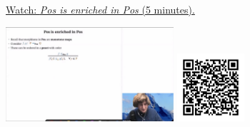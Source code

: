 
\begin{minipage}{10cm}
    \href{https://act4e-spring21.netlify.app/videos/spring2021-enrichment:pos-en-pos.html}{Watch: \emph{Pos is enriched in Pos} (5 minutes).}
        
    \href{https://act4e-spring21.netlify.app/videos/spring2021-enrichment:pos-en-pos.html}{\includegraphics[height=3.5cm]{spring2021-enrichment:pos-en-pos/thumbnails.jpg}}
    \href{https://act4e-spring21.netlify.app/videos/spring2021-enrichment:pos-en-pos.html}{\includegraphics[height=2.5cm]{spring2021-enrichment:pos-en-pos/qrcode.png}}
\end{minipage}
